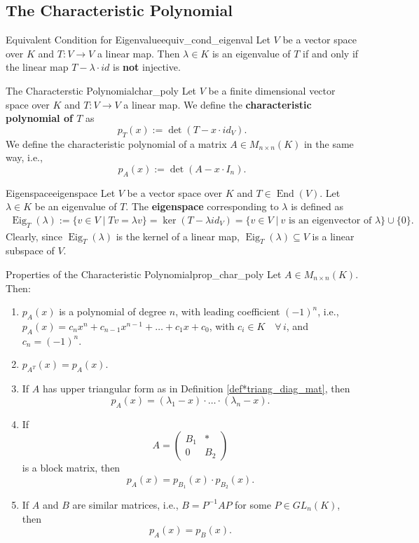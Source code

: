 \subsection{The Characteristic Polynomial}
\begin{proposition}{Equivalent Condition for Eigenvalue}{equiv_cond_eigenval}
	Let $V$ be a vector space over $K$ and $T:V \to V$ a linear map. Then $\lambda \in K$ is an eigenvalue of $T$ if and only if the linear map $T - \lambda \cdot id$ is \textbf{not} injective.
\end{proposition}

\begin{definition}{The Characterstic Polynomial}{char_poly}
	Let $V$ be a finite dimensional vector space over $K$ and $T:V \to V$ a linear map. We define the \textbf{characteristic polynomial of $T$} as
	\[
		p_T(x) := \det(T - x \cdot id_V).
	\]
	We define the characteristic polynomial of a matrix $A \in M_{n\times n}(K)$ in the same way, i.e.,
	\[
		p_A(x) := \det(A - x \cdot I_n).
	\]
\end{definition}

\begin{definition}{Eigenspace}{eigenspace}
	Let $V$ be a vector space over $K$ and $T \in \operatorname{End}(V)$. Let $\lambda \in K$ be an eigenvalue of $T$. The \textbf{eigenspace} corresponding to $\lambda$ is defined as
	\begin{align*}
		\operatorname{Eig}_T(\lambda) := \{ v \in V \;|\; Tv = \lambda v\} = \ker(T - \lambda id_V) = \{v \in V \;|\: v \text{ is an eigenvector of } \lambda\} \cup \{0\}.
	\end{align*}
	Clearly, since $\operatorname{Eig}_T(\lambda)$ is the kernel of a linear map, $\operatorname{Eig}_T(\lambda) \subseteq V$ is a linear subspace of $V$.
\end{definition}

\begin{lemma}{Properties of the Characteristic Polynomial}{prop_char_poly}
	Let $A \in M_{n\times n}(K)$. Then:
	\begin{enumerate}
		\item $p_A(x)$ is a polynomial of degree $n$, with leading coefficient $(-1)^n$, i.e., $p_A(x) = c_n x^n + c_{n-1}x^{n-1} + \hdots + c_1 x + c_0$, with $c_i \in K \quad \forall \, i$, and $c_n = (-1)^n$.
		\item $p_{A^T}(x) = p_A(x)$.
		\item If $A$ has upper triangular form as in Definition \ref{def*triang_diag_mat}, then
		\[
			p_A(x) = (\lambda_1 - x)\cdot \hdots \cdot (\lambda_n - x).
		\]
		\item If
		\[
			A = \begin{pmatrix}
				B_1 & \ast\\
				0 & B_2
			\end{pmatrix}
		\]
		is a block matrix, then
		\[
			p_A(x) = p_{B_1}(x) \cdot p_{B_2}(x).
		\]
		\item If $A$ and $B$ are similar matrices, i.e., $B = P^{-1} A P$ for some $P \in GL_n(K)$, then
		\[
			p_A(x) = p_B(x).
		\]
	\end{enumerate}
\end{lemma}

